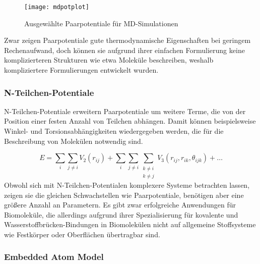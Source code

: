 \begin{figure}[b]
  \centering
  \texttt{[image: mdpotplot]}
  \caption{Ausgewählte Paarpotentiale für MD-Simulationen}
  \label{fig:mdpairpotentials}
\end{figure}

Zwar zeigen Paarpotentiale gute thermodynamische Eigenschaften bei geringem Rechenaufwand, doch können sie aufgrund ihrer einfachen Formulierung keine komplizierteren Strukturen wie etwa Moleküle beschreiben, weshalb kompliziertere Formulierungen entwickelt wurden.

\subsubsection{N-Teilchen-Potentiale}

N-Teilchen-Potentiale erweitern Paarpotentiale um weitere Terme, die von der Position einer festen Anzahl von Teilchen abhängen.
Damit können beispielsweise Winkel- und Torsionsabhängigkeiten wiedergegeben werden, die für die Beschreibung von Molekülen notwendig sind.

\begin{equation}
  E = \sum_i\sum_{j \neq i}{V_2\left(r_{ij}\right)} + \sum_i\sum_{j \neq i}\sum_{\substack{k \neq i \\ k \neq j}}{V_3\left(r_{ij}, r_{ik}, \theta_{ijk}\right)} + \dots
\end{equation}
Obwohl sich mit N-Teilchen-Potentialen komplexere Systeme betrachten lassen, zeigen sie die gleichen Schwachstellen wie Paarpotentiale, benötigen aber eine größere Anzahl an Parametern.
Es gibt zwar erfolgreiche Anwendungen für Biomoleküle\cite{case_amber_2005,brooks_charmm:_1983,brooks_charmm:_2009,berendsen_gromacs:_1995,hess_gromacs_2008}, die allerdings aufgrund ihrer Spezialisierung für kovalente und Wasserstoffbrücken-Bindungen in Biomolekülen nicht auf allgemeine Stoffsysteme wie Festkörper oder Oberflächen übertragbar sind.

\subsubsection{Embedded Atom Model}

